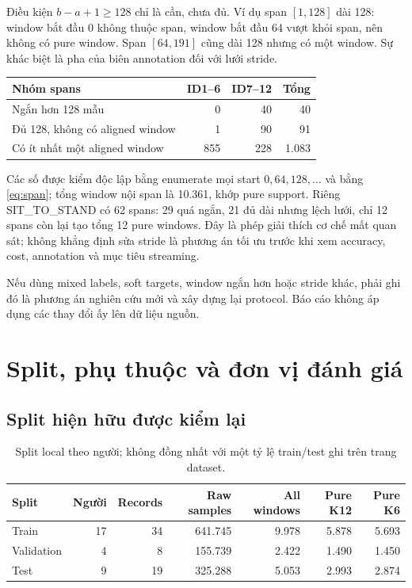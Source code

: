 \documentclass[11pt,a4paper]{article}
\theoremstyle{definition}
\begin{document}
Điều kiện $b-a+1\ge128$ chỉ là cần, chưa đủ. Ví dụ span $[1,128]$ dài
128: window bắt đầu 0 không thuộc span, window bắt đầu 64 vượt khỏi span,
nên không có pure window. Span $[64,191]$ cũng dài 128 nhưng có một window.
Sự khác biệt là pha của biên annotation đối với lưới stride.

\begin{tabular}{@{}lrrr@{}}\toprule
Nhóm spans & ID1--6 & ID7--12 & Tổng\\\midrule
Ngắn hơn 128 mẫu & 0 & 40 & 40\\
Đủ 128, không có aligned window & 1 & 90 & 91\\
Có ít nhất một aligned window & 855 & 228 & 1.083\\\bottomrule
\end{tabular}

Các số được kiểm độc lập bằng enumerate mọi start $0,64,128,\ldots$ và bằng
\eqref{eq:span}; tổng window nội span là 10.361, khớp pure support. Riêng
SIT\_TO\_STAND có 62 spans: 29 quá ngắn, 21 đủ dài nhưng lệch lưới, chỉ
12 spans còn lại tạo tổng 12 pure windows. Đây là phép giải thích cơ chế
mất quan sát; không khẳng định sửa stride là phương án tối ưu trước khi
xem accuracy, cost, annotation và mục tiêu streaming.

Nếu dùng mixed labels, soft targets, window ngắn hơn hoặc stride khác,
phải ghi đó là phương án nghiên cứu mới và xây dựng lại protocol. Báo cáo
không áp dụng các thay đổi ấy lên dữ liệu nguồn.

\section{Split, phụ thuộc và đơn vị đánh giá}
\subsection{Split hiện hữu được kiểm lại}
\begin{table}[htbp]\centering\small
\begin{tabular}{@{}lrrrrrr@{}}\toprule
Split & Người & Records & Raw samples & All windows & Pure K12 & Pure K6\\\midrule
Train & 17 & 34 & 641.745 & 9.978 & 5.878 & 5.693\\
Validation & 4 & 8 & 155.739 & 2.422 & 1.490 & 1.450\\
Test & 9 & 19 & 325.288 & 5.053 & 2.993 & 2.874\\\bottomrule
\end{tabular}
\caption{Split local theo người; không đồng nhất với một tỷ lệ train/test ghi trên trang dataset.}
\end{table}
\end{document}
